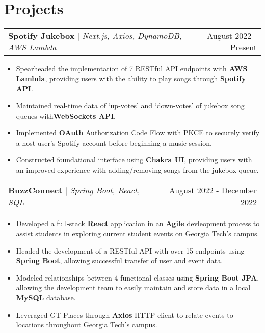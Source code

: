 \documentclass[letterpaper,11pt]{article}
\makeatletter
\newcommand{\resumeProjectHeading}[3]{
    \begin{tabular*}{0.97\textwidth}[t]{l@{\extracolsep{\fill}}r}
      \textbf{#1} $\vert$ \textit{#2}  & {#3}
    \end{tabular*}\vspace{-3pt}
}
\newcommand{\resumeItemListStart}{\begin{itemize}[noitemsep]\vspace{-4pt}}
\newcommand{\resumeItemListEnd}{\end{itemize}}
\makeatother
\begin{document}
\section{Projects}
    \resumeProjectHeading{Spotify Jukebox}{Next.js, Axios, DynamoDB, AWS Lambda}{August 2022 - Present}
      \resumeItemListStart
        \item {Spearheaded the implementation of 7 RESTful API endpoints with \textbf{AWS Lambda}, providing users with the ability to play songs through \textbf{Spotify API}.}
        \item {Maintained real-time data of `up-votes' and `down-votes' of jukebox song queues with\textbf{WebSockets API}.}
        \item {Implemented \textbf{OAuth} Authorization Code Flow with PKCE to securely verify a host user's Spotify account before beginning a music session.}
        \item {Constructed foundational interface using \textbf{Chakra UI}, providing users with an improved experience with adding/removing songs from the jukebox queue.}
      \resumeItemListEnd

    \resumeProjectHeading{BuzzConnect}{Spring Boot, React, SQL}{August 2022 - December 2022}
      \resumeItemListStart
        \item {Developed a full-stack \textbf{React} application in an \textbf{Agile} devleopment process to assist students in exploring current student events on Georgia Tech's campus.}
        \item {Headed the development of a RESTful API with over 15 endpoints using \textbf{Spring Boot}, allowing successful transfer of user and event data.}
        \item {Modeled relationships between 4 functional classes using \textbf{Spring Boot JPA}, allowing the development team to easily maintain and store data in a local \textbf{MySQL} database.}
        \item {Leveraged GT Places through \textbf{Axios} HTTP client to relate events to locations throughout Georgia Tech's campus.}
      \resumeItemListEnd

\end{document}
